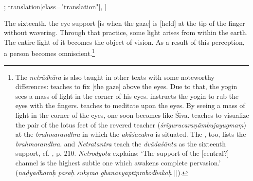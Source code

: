 \begin{alignment}[
  texts=edition[class="edition"];
  translation[class="translation"],
  ]
\begin{translation}
\begin{tlate}[p30_05]
      The sixteenth, the eye support [is when the gaze] is [held] at the tip of the finger without wavering. Through that practice, some light arises from within the earth. The entire light of it becomes the object of vision. As a result of this perception, a person becomes omniscient.\footnote{The \textit{netrādhāra} is also taught in other texts with some noteworthy differences:  teaches to fix [the gaze] above the eyes. Due to that, the yogin sees a mass of light in the corner of his eyes.  instructs the yogin to rub the eyes with the fingers.  teaches to meditate upon the eyes. By seeing a mass of light in the corner of the eyes, one soon becomes like Śiva.  teaches to visualize the pair of the lotus feet of the revered teacher (\textit{śrīgurucaraṇāmbujayugmaṃ}) at the \textit{brahmarandhra} in which the \textit{akāśacakra} is situated. The , too, lists the \textit{brahmarandhra}.  and \textit{Netratantra} teach the \textit{dvādaśānta} as the sixteenth support, cf. , p. 210. \textit{Netrodyota} explains: `The support of the [central?] channel is the highest subtle one which awakens complete pervasion.’ (\textit{nāḍyādhāraḥ paraḥ sūkṣmo ghanavyāptiprabodhakaḥ} ||).}
      \flushpage 
    \end{tlate}
  \end{translation}
\end{alignment}
\pagebreak %
